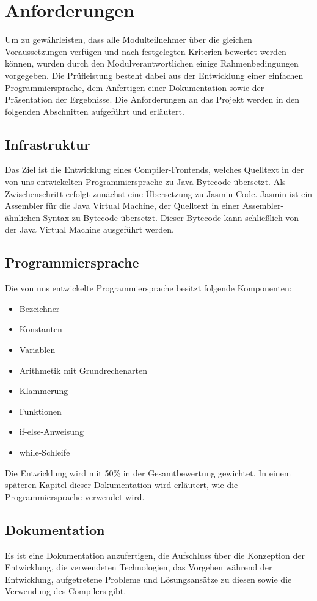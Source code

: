 
\section{Anforderungen}
\label{sec:anforderungen}
Um zu gewährleisten, dass alle Modulteilnehmer über die gleichen Voraussetzungen verfügen und nach festgelegten Kriterien bewertet werden können, wurden durch den Modulverantwortlichen einige Rahmenbedingungen vorgegeben. Die Prüfleistung besteht dabei aus der Entwicklung einer einfachen Programmiersprache, dem Anfertigen einer Dokumentation sowie der Präsentation der Ergebnisse. Die Anforderungen an das Projekt werden in den folgenden Abschnitten aufgeführt und erläutert.

\subsection{Infrastruktur}
Das Ziel ist die Entwicklung eines Compiler-Frontends, welches Quelltext in der von uns entwickelten Programmiersprache zu Java-Bytecode übersetzt.
Als Zwischenschritt erfolgt zunächst eine Übersetzung zu Jasmin-Code. 
Jasmin ist ein Assembler für die Java Virtual Machine, der Quelltext in einer Assembler-ähnlichen Syntax zu Bytecode übersetzt. 
Dieser Bytecode kann schließlich von der Java Virtual Machine ausgeführt werden.


\subsection{Programmiersprache}
Die von uns entwickelte Programmiersprache besitzt folgende Komponenten: 
\begin{itemize}
\item Bezeichner
\item Konstanten
\item Variablen
\item Arithmetik mit Grundrechenarten
\item Klammerung
\item Funktionen
\item if-else-Anweisung
\item while-Schleife
\end{itemize}

Die Entwicklung wird mit 50\% in der Gesamtbewertung gewichtet.
In einem späteren Kapitel dieser Dokumentation wird erläutert, wie die Programmiersprache verwendet wird.

\subsection{Dokumentation}
Es ist eine Dokumentation anzufertigen, die Aufschluss über die Konzeption der Entwicklung, die verwendeten Technologien, das Vorgehen während der Entwicklung, aufgetretene Probleme und Lösungsansätze zu diesen sowie die Verwendung des Compilers gibt.

